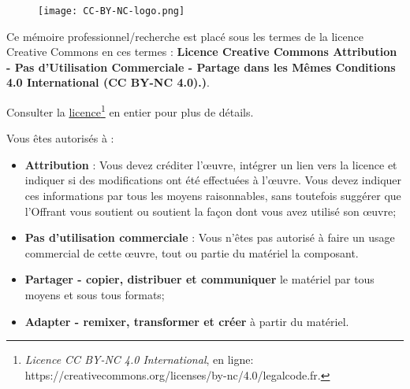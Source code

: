         \begin{figure}[H]
            \centering
            \texttt{[image: CC-BY-NC-logo.png]}
            \label{traitement}
        \end{figure}

    Ce mémoire professionnel/recherche est placé sous les termes de la licence Creative Commons en ces termes : \textbf{Licence Creative Commons Attribution - Pas d'Utilisation Commerciale - Partage dans les Mêmes Conditions 4.0 International (CC BY-NC 4.0).)}.
\bigskip

    Consulter la \href{https://creativecommons.org/licenses/by-nc-sa/4.0/legalcode.fr}{licence\footnote{
\textit{Licence CC BY-NC 4.0 International}, en ligne: \url{https://creativecommons.org/licenses/by-nc/4.0/legalcode.fr}.}} en entier pour plus de détails. 
\bigskip

    Vous êtes autorisés à :
    \begin{itemize}
        \item \textbf{Attribution} : Vous devez créditer l'\oe uvre, intégrer un lien vers la licence et indiquer si des modifications ont été effectuées à l'\oe uvre. Vous devez indiquer ces informations par tous les moyens raisonnables, sans toutefois suggérer que l'Offrant vous soutient ou soutient la façon dont vous avez utilisé son \oe uvre;
        \item \textbf{Pas d'utilisation commerciale} : Vous n'êtes pas autorisé à faire un usage commercial de cette \oe uvre, tout ou partie du matériel la composant. 
        \item \textbf{Partager - copier, distribuer et communiquer} le matériel par tous moyens et sous tous formats;
        \item \textbf{Adapter - remixer, transformer et créer} à partir du matériel.
    \end{itemize}
\bigskip

\bigskip
\bigskip
\bigskip
\bigskip
\bigskip
\bigskip
\bigskip
\bigskip
\bigskip
\bigskip
\bigskip
\bigskip
\bigskip
\bigskip
\bigskip
\bigskip
\bigskip
\bigskip
\bigskip

\newpage
\thispagestyle{empty}